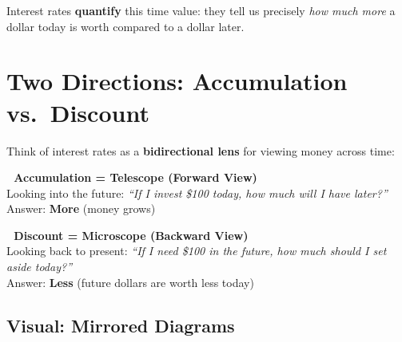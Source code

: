 \documentclass[
  letterpaper,
]{scrbook}
\begin{document}
Interest rates \textbf{quantify} this time value: they tell us precisely
\emph{how much more} a dollar today is worth compared to a dollar later.

\section{Two Directions: Accumulation
vs.~Discount}\label{two-directions-accumulation-vs.-discount}

Think of interest rates as a \textbf{bidirectional lens} for viewing
money across time:

\begin{tcolorbox}[enhanced jigsaw, toptitle=1mm, colbacktitle=quarto-callout-tip-color!10!white, opacityback=0, leftrule=.75mm, breakable, colframe=quarto-callout-tip-color-frame, toprule=.15mm, opacitybacktitle=0.6, coltitle=black, bottomrule=.15mm, colback=white, arc=.35mm, titlerule=0mm, rightrule=.15mm, left=2mm, title=\textcolor{quarto-callout-tip-color}{\faLightbulb}\hspace{0.5em}{The ``Money Lens'' Analogy}, bottomtitle=1mm]

\textbf{🔭 Accumulation = Telescope (Forward View)}\\
Looking into the future: \emph{``If I invest \$100 today, how much will
I have later?''}\\
Answer: \textbf{More} (money grows)

\textbf{🔬 Discount = Microscope (Backward View)}\\
Looking back to present: \emph{``If I need \$100 in the future, how much
should I set aside today?''}\\
Answer: \textbf{Less} (future dollars are worth less today)

\end{tcolorbox}

\subsection{Visual: Mirrored Diagrams}\label{visual-mirrored-diagrams}
\end{document}
